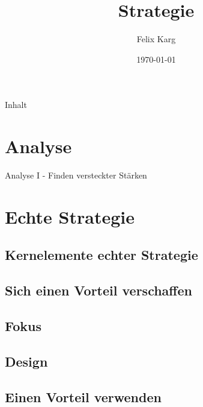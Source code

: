 \documentclass[12pt,compress,ngerman,utf8,t]{beamer}
\date{\today}
\institute{University of Freiburg}
\title{Strategie}
\author{Felix Karg}
\begin{document}
\maketitle


\begin{frame}{Inhalt}
    \small
    \begin{multicols}{2}
        \small
        \tableofcontents[hidesubsections]
    \end{multicols}
    \clearpage
\end{frame}








\section{Analyse}

\begin{frame}{Analyse I - Finden versteckter Stärken}
\end{frame}




\section{Echte Strategie}
\subsection{Kernelemente echter Strategie}
\subsection{Sich einen Vorteil verschaffen}
\subsection{Fokus}
\subsection{Design}
\subsection{Einen Vorteil verwenden}




\end{document}

